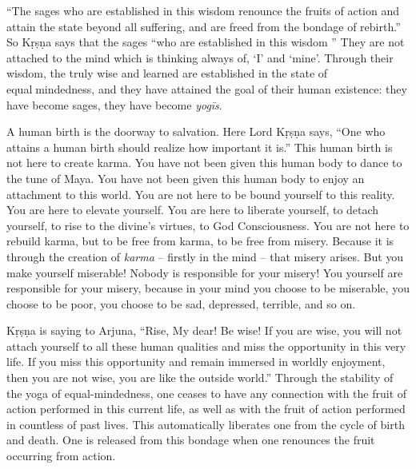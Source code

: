“The sages who are established in this wisdom renounce the fruits of action and attain the state beyond all suffering, and are freed from the bondage of rebirth.” So Kṛṣṇa says that the sages “who are established in this wisdom ” They are not attached to the mind which is thinking always of, ‘I’ and ‘mine’. Through their wisdom, the truly wise and learned are established in the state of equalmindedness, and they have attained the goal of their human existence: they have become sages, they have become \textit{yogīs}.

A human birth is the doorway to salvation. Here Lord Kṛṣṇa says, “One who attains a human birth should realize how important it is.” This human birth is not here to create karma. You have not been given this human body to dance to the tune of Maya. You have not been given this human body to enjoy an attachment to this world. You are not here to be bound yourself to this reality. You are here to elevate yourself. You are here to liberate yourself, to detach yourself, to rise to the divine’s virtues, to God Consciousness. You are not here to rebuild karma, but to be free from karma, to be free from misery. Because it is through the creation of \textit{karma} -- firstly in the mind – that misery arises. But you make yourself miserable! Nobody is responsible for your misery! You yourself are responsible for your misery, because in your mind you choose to be miserable, you choose to be poor, you choose to be sad, depressed, terrible, and so on.

Kṛṣṇa is saying to Arjuna, “Rise, My dear! Be wise! If you are wise, you will not attach yourself to all these human qualities and miss the opportunity in this very life. If you miss this opportunity and remain immersed in worldly enjoyment, then you are not wise, you are like the outside world.” Through the stability of the yoga of equal-mindedness, one ceases to have any connection with the fruit of action performed in this current life, as well as with the fruit of action performed in countless of past lives. This automatically liberates one from the cycle of birth and death. One is released from this bondage when one renounces the fruit occurring from action.

